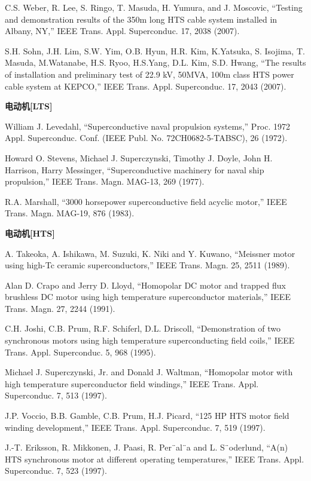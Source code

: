 \noindent [9.200] C.S. Weber, R. Lee, S. Ringo, T. Masuda, H. Yumura, and J. Moscovic, ``Testing
and demonstration results of the 350m long HTS cable system installed in Albany,
NY,” IEEE Trans. Appl. Superconduc. 17, 2038 (2007).

\noindent [9.201] S.H. Sohn, J.H. Lim, S.W. Yim, O.B. Hyun, H.R. Kim, K.Yatsuka, S. Isojima, T. Masuda, M.Watanabe, H.S. Ryoo, H.S.Yang, D.L. Kim, S.D. Hwang, ``The results
of installation and preliminary test of 22.9 kV, 50MVA, 100m class HTS
power cable system at KEPCO,” IEEE Trans. Appl. Superconduc. 17, 2043 (2007).

\noindent \textbf{电动机[LTS] }

\noindent [9.202] William J. Levedahl, ``Superconductive naval propulsion systems,” Proc. 1972
Appl. Superconduc. Conf. (IEEE Publ. No. 72CH0682-5-TABSC), 26 (1972).

\noindent [9.203] Howard O. Stevens, Michael J. Superczynski, Timothy J. Doyle, John H. Harrison,
Harry Messinger, ``Superconductive machinery for naval ship propulsion,” IEEE
Trans. Magn. MAG-13, 269 (1977).

\noindent [9.204] R.A. Marshall, ``3000 horsepower superconductive field acyclic motor,” IEEE
Trans. Magn. MAG-19, 876 (1983).

\noindent \textbf{电动机[HTS] }

\noindent [9.205] A. Takeoka, A. Ishikawa, M. Suzuki, K. Niki and Y. Kuwano, ``Meissner motor
using high-Tc ceramic superconductors,” IEEE Trans. Magn. 25, 2511 (1989).

\noindent [9.206] Alan D. Crapo and Jerry D. Lloyd, ``Homopolar DC motor and trapped flux
brushless DC motor using high temperature superconductor materials,” IEEE
Trans. Magn. 27, 2244 (1991).

\noindent [9.207] C.H. Joshi, C.B. Prum, R.F. Schiferl, D.L. Driscoll, ``Demonstration of two
synchronous motors using high temperature superconducting field coils,” IEEE
Trans. Appl. Superconduc. 5, 968 (1995).

\noindent [9.208] Michael J. Superczynski, Jr. and Donald J. Waltman, ``Homopolar motor with
high temperature superconductor field windings,” IEEE Trans. Appl. Superconduc.
7, 513 (1997).

\noindent [9.209] J.P. Voccio, B.B. Gamble, C.B. Prum, H.J. Picard, ``125 HP HTS motor field
winding development,” IEEE Trans. Appl. Superconduc. 7, 519 (1997).

\noindent [9.210] J.-T. Eriksson, R. Mikkonen, J. Paasi, R. Per¨al¨a and L. S¨oderlund, ``A(n) HTS
synchronous motor at different operating temperatures,” IEEE Trans. Appl. Superconduc.
7, 523 (1997).


